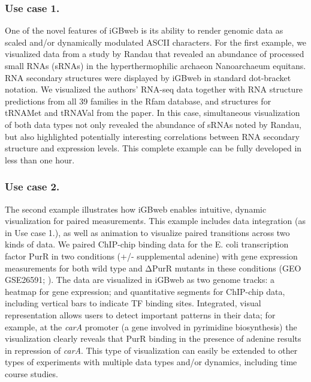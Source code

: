 \subsubsection{Use case 1.} One of the novel features of iGBweb is its ability to render genomic data as scaled and/or dynamically modulated ASCII characters. For the first example, we visualized data from a study by Randau \cite{randau_rna_2012} that revealed an abundance of processed small RNAs (sRNAs) in the hyperthermophilic archaeon Nanoarchaeum equitans. RNA secondary structures were displayed by iGBweb in standard dot-bracket notation. We visualized the authors’ RNA-seq data together with RNA structure predictions from all 39 families in the Rfam database, and structures for tRNAMet and tRNAVal from the paper. In this case, simultaneous visualization of both data types not only revealed the abundance of sRNAs noted by Randau, but also highlighted potentially interesting correlations between RNA secondary structure and expression levels. This complete example can be fully developed in less than one hour. 

\subsubsection{Use case 2.} The second example illustrates how iGBweb enables intuitive, dynamic visualization for paired measurements. This example includes data integration (as in Use case 1.), as well as animation to visualize paired transitions across two kinds of data. We paired ChIP-chip binding data for the E. coli transcription factor PurR in two conditions (+/- supplemental adenine) with gene expression measurements for both wild type and ΔPurR mutants in these conditions (GEO GSE26591; \cite{cho_purr_2011}). The data are visualized in iGBweb as two genome tracks: a heatmap for gene expression; and quantitative segments for ChIP-chip data, including vertical bars to indicate TF binding sites. Integrated, visual representation allows users to detect important patterns in their data; for example, at the \textit{carA} promoter (a gene involved in pyrimidine biosynthesis) the visualization clearly reveals that PurR binding in the presence of adenine results in repression of \textit{carA}. This type of visualization can easily be extended to other types of experiments with multiple data types and/or dynamics, including time course studies. 

